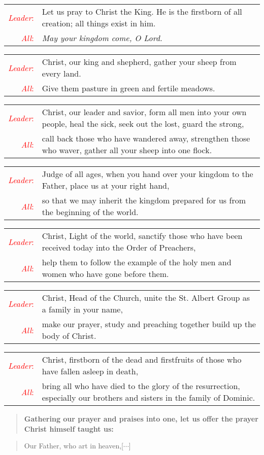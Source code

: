 \documentclass[letterpaper,14pt]{extarticle}
\newcommand{\side}[1]{\flagverse{\textcolor{red}{\textit{#1}}:}}
\newcommand{\sidestar}[1]{\textcolor{red}{\textit{#1}:}}
\newlength{\oldindent}
\newcommand{\antiphon}[2]{
	\setlength{\oldindent}{\vindent}
	\setlength{\vindent}{0em}
	\begin{verse}
	\side{#1} \textbf{#2}
	\end{verse}
	\setlength{\vindent}{\oldindent}
}
\newcommand{\intercession}[2]{
	\begin{tabular}[h]{r p{4.25in}}
		\sidestar{Leader} & #1 \\
		\sidestar{All} & #2
	\end{tabular}}
\begin{document}
\intercession{Let us pray to Christ the King. He is the firstborn of all creation; all things exist in him.}
{\textit{May your kingdom come, O Lord.}}

\intercession{Christ, our king and shepherd, gather your sheep from every land.}
{Give them pasture in green and fertile meadows.}

\intercession{Christ, our leader and savior, form all men into your own people, heal the sick, seek out the lost, guard the strong,}
{call back those who have wandered away, strengthen those who waver, gather all your sheep into one flock.}

\intercession{Judge of all ages, when you hand over your kingdom to the Father, place us at your right hand,}
{so that we may inherit the kingdom prepared for us from the beginning of the world.}

\intercession{Christ, Light of the world, sanctify those who have been received today into the Order of Preachers,}
{help them to follow the example of the holy men and women who have gone before them.}

\intercession{Christ, Head of the Church, unite the St. Albert Group as a family in your name,}
{make our prayer, study and preaching together build up the body of Christ.}





\intercession{Christ, firstborn of the dead and firstfruits of those who have fallen asleep in death,}
{bring all who have died to the glory of the resurrection, especially our brothers and sisters in the family of Dominic.}

\antiphon{Leader}{Gathering our prayer and praises into one, let us offer the
prayer Christ himself taught us:}
\begin{verse}
	\side{All} Our Father, who art in heaven,[$\cdots$] \\
\end{verse}
\end{document}
